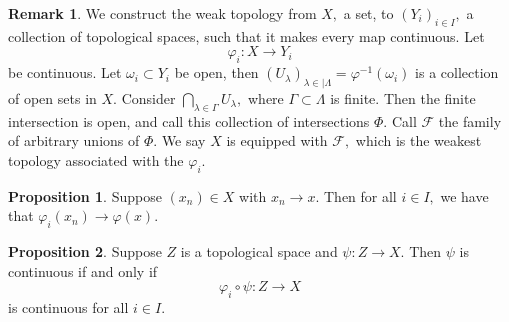 \documentclass[10pt, oneside]{article}
\theoremstyle{definition}
\newtheorem{prop}{Proposition}
\newtheorem{rem}{Remark}
\begin{document}
\begin{rem}
    We construct the weak topology from $X,$ a set, to $(Y_i)_{i\in I},$ a collection of topological spaces, such that it makes every map continuous. Let 
    \[\varphi_i: X \to Y_i\] be continuous. Let $\omega_i \subset Y_i$ be open, then $(U_\lambda)_{\lambda \in |\Lambda} = \varphi^{-1}(\omega_i)$ is a collection of open sets in $X.$ Consider $\bigcap_{\lambda \in \Gamma}U_\lambda,$ where $\Gamma \subset \Lambda$ is finite. Then the finite intersection is open, and call this collection of intersections $\Phi.$ Call $\mathcal{F}$ the family of arbitrary unions of $\Phi.$ We say $X$ is equipped with $\mathcal{F},$ which is the weakest topology associated with the $\varphi_i.$
\end{rem}

\begin{prop}
    Suppose $(x_n)\in X$ with $x_n \to x.$ Then for all $i \in I,$ we have that $\varphi_i(x_n) \to \varphi(x).$ 
\end{prop}

\begin{prop}
    Suppose $Z$ is a topological space and $\psi: Z \to X.$ Then $\psi$ is continuous if and only if 
    \[\varphi_i \circ \psi: Z \to X\] is continuous for all $i\in I.$
\end{prop}


\newpage
\end{document}
